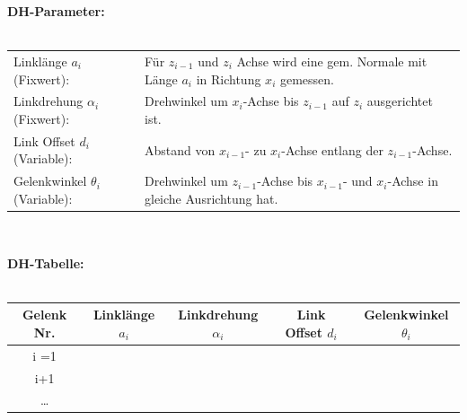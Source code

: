 \begin{minipage}{19cm}
    \textbf{DH-Parameter:}\\ \\
    \begin{tabular}{l l}
        Linklänge $a_i$ (Fixwert): 				& Für $z_{i-1}$ und $z_i$ Achse wird eine gem. Normale mit Länge $a_i$ in Richtung $x_i$ gemessen.\\
        Linkdrehung $\alpha_{i}$ (Fixwert):		& Drehwinkel um $x_i$-Achse bis $z_{i-1}$ auf $z_i$ ausgerichtet ist.\\
        Link Offset $d_i$ (Variable):			& Abstand von $x_{i-1}$- zu $x_i$-Achse entlang der $z_{i-1}$-Achse.\\
        Gelenkwinkel $\theta_{i}$ (Variable):	& Drehwinkel um $z_{i-1}$-Achse bis $x_{i-1}$- und $x_i$-Achse in gleiche Ausrichtung hat.\\
    \end{tabular}
    \vspace{0.5cm}
\end{minipage}\\
\begin{minipage}{19cm}
    \textbf{DH-Tabelle:}\\ \\
    \begin{minipage}{10cm}
        \renewcommand{\arraystretch}{1.1}
        \begin{tabular}{| c | c | c | c | c |}
            \hline
            \textbf{Gelenk Nr.}
            & \textbf{Linklänge $a_i$}
            & \textbf{Linkdrehung $\alpha_{i}$}
            & \textbf{Link Offset $d_i$} 
            & \textbf{Gelenkwinkel $\theta_{i}$}\\
            \hline
            i =1
            &&&& \\
            \hline
            i+1
            &&&& \\
            \hline
            \ldots
            &&&&\\
            \hline
        \end{tabular}
        \renewcommand{\arraystretch}{1}
        \vspace{0.5cm}
    \end{minipage}
\end{minipage}\\
